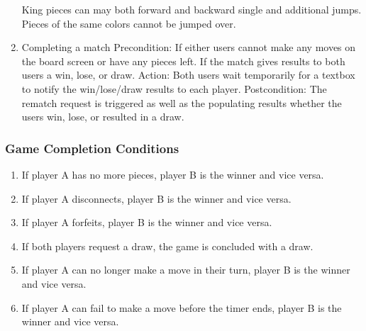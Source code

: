 \documentclass[10pt]{article}
\begin{document}
\begin{enumerate}
        \subitem King pieces can may both forward and backward single and additional jumps.
        \subitem Pieces of the same colors cannot be jumped over.
    \item Completing a match
        \subitem Precondition:
            \subsubitem If either users cannot make any moves on the board screen or have any pieces left.
            \subsubitem If the match gives results to both users a win, lose, or draw.
        \subitem Action: Both users wait temporarily for a textbox to notify the win/lose/draw results to each player.
        \subitem Postcondition: The rematch request is triggered as well as the populating results whether the users win, lose, or resulted in a draw.
\end{enumerate}

\subsubsection{Game Completion Conditions}

\begin{enumerate}
    \item If player A has no more pieces, player B is the winner and vice versa.
    \item If player A disconnects, player B is the winner and vice versa.
    \item If player A forfeits, player B is the winner and vice versa.
    \item If both players request a draw, the game is concluded with a draw.
    \item If player A can no longer make a move in their turn, player B is the winner and vice versa.
    \item If player A can fail to make a move before the timer ends, player B is the winner and vice versa.
\end{enumerate}
\end{document}
